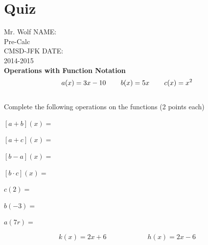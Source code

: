 \documentclass[12pt]{article}
\let\stdsection\section
\renewcommand\section{\newpage\stdsection}
\begin{document}
\section*{Quiz}

Mr. Wolf \hfill NAME:\underline{\hspace{3in}}\\ 
Pre-Calc \\ 
CMSD-JFK \hfill DATE:\underline{\hspace{2in}}\\
2014-2015\\

\textbf{Operations with Function Notation}\\

$$a(x)=3x-10 \hspace{.3in} b(x)=5x \hspace{.3in} c(x)=x^2$$\\

Complete the following operations on the functions (2 points each)\\

\begin{enumerate}
\begin{multicols}{2}
	\setlength\itemsep{1cm}

	\item $[a+b](x)=$\\
	
	\item $[a+c](x)=$\\
	
	\item $[b-a](x)=$\\
	
	\item $[b \cdot c](x)=$\\
	
	\item $c(2)=$\\
	
	\item $b(-3)=$\\
	
	\item $a(7r)=$\\

\end{multicols}
\end{enumerate}

\hrulefill

$$k(x)=2x+6 \hspace{1in} h(x)=2x-6$$
\end{document}
